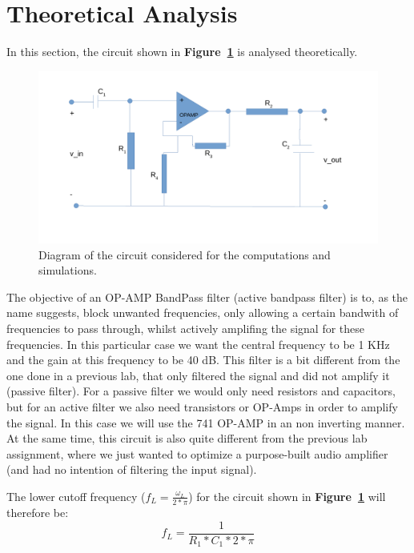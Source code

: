 \section{Theoretical Analysis}
\label{sec:analysis}

In this section, the circuit shown in \textbf{Figure~\ref{fig:diagram_t5}} is analysed
theoretically.
\begin{figure}[h] \centering
\includegraphics[width=0.95\linewidth]{diagram_t5.pdf}
\caption{Diagram of the circuit considered for the computations and simulations.}
\label{fig:diagram_t5}
\end{figure}


The objective of an OP-AMP BandPass filter (active bandpass filter) is to, as the name suggests, block unwanted frequencies, only allowing a certain bandwith of frequencies to pass through, whilst actively amplifing the signal for these frequencies. In this particular case we want the central frequency to be 1 KHz and the gain at this frequency to be 40 dB. This filter is a bit different from the one done in a previous lab, that only filtered the signal and did not amplify it (passive filter). For  a passive filter we would only need resistors and capacitors, but for an active filter we also need transistors or OP-Amps in order to amplify the signal. In this case we will use the 741 OP-AMP in an non inverting manner. At the same time, this circuit is also quite different from the previous lab assignment, where we just wanted to optimize a purpose-built audio amplifier (and had no intention of filtering the input signal).\par 


The lower cutoff frequency ($f_L = \frac{\omega_L}{2*\pi}$) for the circuit shown in \textbf{Figure~\ref{fig:diagram_t5}} will therefore be:
\begin {equation}
	f_L= \frac{1}{R_1*C_1*2*\pi}   
	\label{eq:lcf}
\end{equation}


